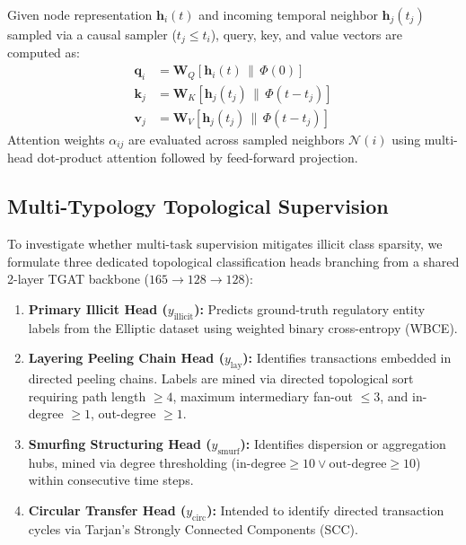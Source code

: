 \documentclass[conference]{IEEEtran}
\begin{document}
Given node representation $\mathbf{h}_i(t)$ and incoming temporal neighbor $\mathbf{h}_j(t_j)$ sampled via a causal sampler ($t_j \le t_i$), query, key, and value vectors are computed as:
\begin{align}
\mathbf{q}_i &= \mathbf{W}_Q [\mathbf{h}_i(t) \,\|\, \Phi(0)] \\
\mathbf{k}_j &= \mathbf{W}_K [\mathbf{h}_j(t_j) \,\|\, \Phi(t - t_j)] \\
\mathbf{v}_j &= \mathbf{W}_V [\mathbf{h}_j(t_j) \,\|\, \Phi(t - t_j)]
\end{align}
Attention weights $\alpha_{ij}$ are evaluated across sampled neighbors $\mathcal{N}(i)$ using multi-head dot-product attention followed by feed-forward projection.

\subsection{Multi-Typology Topological Supervision}
To investigate whether multi-task supervision mitigates illicit class sparsity, we formulate three dedicated topological classification heads branching from a shared 2-layer TGAT backbone ($165 \to 128 \to 128$):
\begin{enumerate}
    \item \textbf{Primary Illicit Head ($y_{\text{illicit}}$):} Predicts ground-truth regulatory entity labels from the Elliptic dataset using weighted binary cross-entropy (WBCE).
    \item \textbf{Layering Peeling Chain Head ($y_{\text{lay}}$):} Identifies transactions embedded in directed peeling chains. Labels are mined via directed topological sort requiring path length $\ge 4$, maximum intermediary fan-out $\le 3$, and in-degree $\ge 1$, out-degree $\ge 1$.
    \item \textbf{Smurfing Structuring Head ($y_{\text{smurf}}$):} Identifies dispersion or aggregation hubs, mined via degree thresholding ($\text{in-degree} \ge 10 \lor \text{out-degree} \ge 10$) within consecutive time steps.
    \item \textbf{Circular Transfer Head ($y_{\text{circ}}$):} Intended to identify directed transaction cycles via Tarjan's Strongly Connected Components (SCC). 
\end{enumerate}
\end{document}
